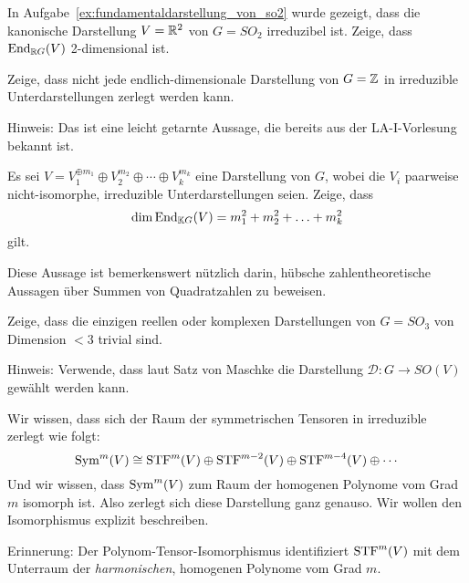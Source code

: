 \begin{sheet}

\begin{problem}[title={Satz von Schur über Körpern $\neq\IC$}]
In Aufgabe~\ref{ex:fundamentaldarstellung_von_so2} wurde gezeigt, dass die kanonische Darstellung $V=\mathbb{R}^2$ von $G=SO_2$ irreduzibel ist. Zeige, dass $\operatorname{End}_{\mathbb{R} G}(V)$ 2-dimensional ist.
\end{problem}

\begin{problem}[title={Der Satz von Maschke ist falsch für nichtkompakte Gruppen}, difficulty={leichter als es aussieht}]
Zeige, dass nicht jede endlich-dimensionale Darstellung von $G=\mathbb{Z}$ in irreduzible Unterdarstellungen zerlegt werden kann.

Hinweis: Das ist eine leicht getarnte Aussage, die bereits aus der LA-I-Vorlesung bekannt ist.
\end{problem}


\begin{problem}[title={Dimension von Endomorphismenräumen}]
Es sei $V = V_1^{\oplus m_1} \oplus V_2^{m_2} \oplus \cdots \oplus V_k^{m_k}$ eine Darstellung von $G$, wobei die $V_i$ paarweise nicht-isomorphe, irreduzible Unterdarstellungen seien. Zeige, dass
\[\dim \operatorname{End}_{\mathbb{K} G}(V) = m_1^2 + m_2^2 + \ldots + m_k^2\]
gilt.
\end{problem}

\begin{remark}
Diese Aussage ist bemerkenswert nützlich darin, hübsche zahlentheoretische Aussagen über Summen von Quadratzahlen zu beweisen.
\end{remark}

\begin{problem}[title={2D-Darstellungen von $SO_3$}]
	\label{ex:keine_2D_darstellung_von_so3}
Zeige, dass die einzigen reellen oder komplexen Darstellungen von $G=SO_3$ von Dimension $<3$ trivial sind.

Hinweis: Verwende, dass laut Satz von Maschke die Darstellung $\mathcal{D}: G\to SO(V)$ gewählt werden kann.
\end{problem}

\begin{problem}[title={Isomorphismus zwischen irreduziblen Darstellungen von Polynomen und Tensoren}]
Wir wissen, dass sich der Raum der symmetrischen Tensoren in irreduzible zerlegt wie folgt:
\[\operatorname{Sym}^m(V) \cong \operatorname{STF}^m(V) \oplus \operatorname{STF}^{m-2}(V) \oplus \operatorname{STF}^{m-4}(V) \oplus \cdots\]
Und wir wissen, dass $\operatorname{Sym}^m(V)$ zum Raum der homogenen Polynome vom Grad $m$ isomorph ist. Also zerlegt sich diese Darstellung ganz genauso. Wir wollen den Isomorphismus explizit beschreiben.
\begin{subproblem}
Erinnerung: Der Polynom-Tensor-Isomorphismus identifiziert $\operatorname{STF}^m(V)$ mit dem Unterraum der \emph{harmonischen}, homogenen Polynome vom Grad $m$.


\end{subproblem}
\end{problem}
\end{sheet}
